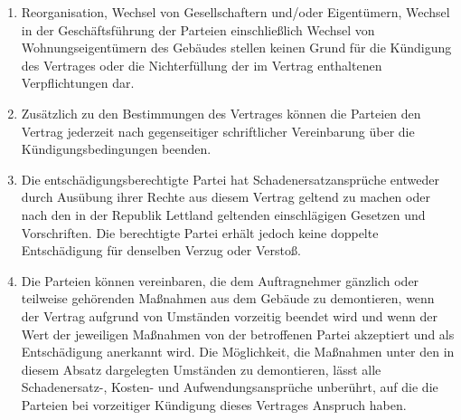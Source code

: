 \begin{multicols}{2}
\begin{enumerate}
   \item Reorganisation, Wechsel von Gesellschaftern und/oder Eigentümern, Wechsel in der Geschäftsführung der Parteien einschließlich Wechsel von Wohnungseigentümern des Gebäudes stellen keinen Grund für die Kündigung des Vertrages oder die Nichterfüllung der im Vertrag enthaltenen Verpflichtungen dar.
   \item Zusätzlich zu den Bestimmungen des Vertrages können die Parteien den Vertrag jederzeit nach gegenseitiger schriftlicher Vereinbarung über die Kündigungsbedingungen beenden.
   \item Die entschädigungsberechtigte Partei hat Schadenersatzansprüche entweder durch Ausübung ihrer Rechte aus diesem Vertrag geltend zu machen oder nach den in der Republik Lettland geltenden einschlägigen Gesetzen und Vorschriften. Die berechtigte Partei erhält jedoch keine doppelte Entschädigung für denselben Verzug oder Verstoß.
   \item Die Parteien können vereinbaren, die dem Auftragnehmer gänzlich oder teilweise gehörenden Maßnahmen aus dem Gebäude zu demontieren, wenn der Vertrag aufgrund von Umständen vorzeitig beendet wird und wenn der Wert der jeweiligen Maßnahmen von der betroffenen Partei akzeptiert und als Entschädigung anerkannt wird. Die Möglichkeit, die Maßnahmen unter den in diesem Absatz dargelegten Umständen zu demontieren, lässt alle Schadenersatz-, Kosten- und Aufwendungsansprüche unberührt, auf die die Parteien bei vorzeitiger Kündigung dieses Vertrages Anspruch haben.
   \end{enumerate}


\end{multicols}

